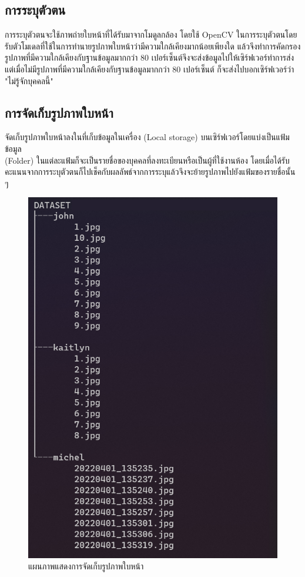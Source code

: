 \subsection{การระบุตัวตน}
การระบุตัวตนจะใช้ภาพถ่ายใบหน้าที่ได้รับมาจากโมดูลกล้อง โดยใช้ OpenCV ในการระบุตัวตนโดยรับตัวโมเดลที่ใช้ในการทำนายรูปภาพใบหน้าว่ามีความใกล้เคียงมากน้อยเพียงใด
แล้วจึงทำการคัดกรองรูปภาพที่มีความใกล้เคียงกับฐานข้อมูลมากกว่า 80 เปอร์เซ็นต์จึงจะส่งข้อมูลไปให้เซิร์ฟเวอร์ทำการส่ง 
แต่เมื่อไม่มีรูปภาพที่มีความใกล้เคียงกับฐานข้อมูลมากกว่า 80 เปอร์เซ็นต์ ก็จะส่งไปบอกเซิร์ฟเวอร์ว่า "ไม่รู้จักบุคคลนี้"

\subsection{การจัดเก็บรูปภาพใบหน้า}
จัดเก็บรูปภาพใบหน้าลงในที่เก็บข้อมูลในเครื่อง (Local storage) บนเซิร์ฟเวอร์โดยแบ่งเป็นแฟ้มข้อมูล \\(Folder) 
ในแต่ละแฟ้มก็จะเป็นรายชื่อของบุคคลที่ลงทะเบียนหรือเป็นผู้ที่ใช้งานห้อง 
โดยเมื่อได้รับคะแนนจากการระบุตัวตนก็ไปเช็คกับผลลัพธ์จากการระบุแล้วจึงจะย้ายรูปภาพไปยังแฟ้มของรายชื่อนั้น ๆ

\begin{figure}[ht]
  \begin{center}
    \includegraphics[scale=.5]{pic/dataset.png}
  \caption[แผนภาพแสดงการจัดเก็บรูปภาพใบหน้า]{แผนภาพแสดงการจัดเก็บรูปภาพใบหน้า}
  \end{center}
  \label{fig:folder}
\end{figure}
\newpage

